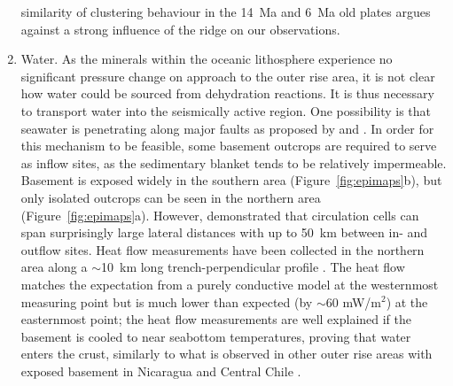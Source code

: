 \documentclass[reviewcopy]{elsart}
\begin{document}
\begin{enumerate}
  similarity of clustering behaviour in the 14~Ma and 6~Ma old plates
  argues against a strong influence of the ridge on our observations. 
\item Water. As the minerals within the oceanic lithosphere experience
  no significant pressure change on approach to the outer rise area,
  it is not clear how water could be sourced from dehydration
  reactions.  It is thus necessary to transport water into the
  seismically active region.   One possibility is that seawater is
  penetrating along major faults as proposed by \citet{peacock01} and
  \citet{ranero03}.   In order for this mechanism to be feasible,
  some basement outcrops are required to serve as inflow sites,
 as the sedimentary blanket tends to be relatively
 impermeable. 
Basement is exposed widely in the southern area
(Figure~\ref{fig:epimaps}b), but only isolated outcrops can be seen in
the northern area (Figure~\ref{fig:epimaps}a).  However,
\citet{fisher03_juandefuca} demonstrated that circulation cells can span
surprisingly large lateral distances with up to 50~km between in- and
outflow sites.  Heat flow measurements have been collected in the
northern area along a $\sim$10~km long trench-perpendicular profile \citep[see
Figure~\protect\ref{fig:epimaps}a for approximate location]{contreras-reyes07}. The
heat flow matches the expectation from a purely conductive model at
the westernmost measuring point but is much lower than expected (by 
$\sim$60 mW/m$^2$) at the easternmost point; the heat flow
measurements are well explained if the basement is cooled to near
seabottom temperatures, proving that water enters the crust, similarly
to what is observed in other outer rise areas with exposed
basement in Nicaragua and Central Chile \citep{grevemeyer05}.


\end{enumerate}
\end{document}

